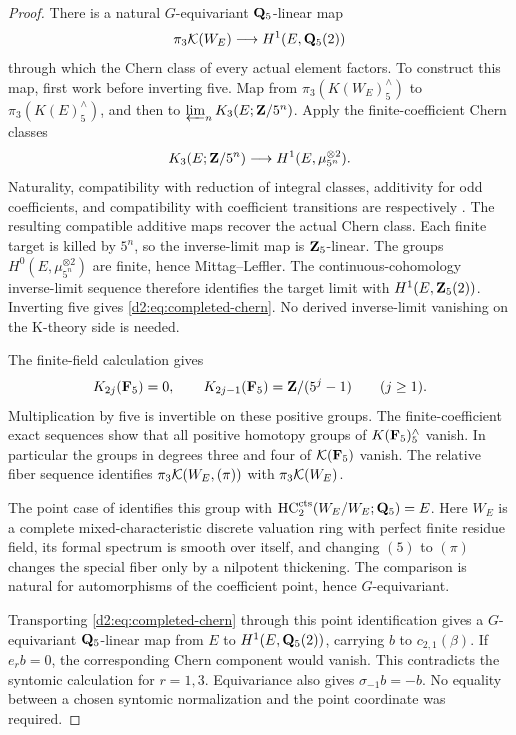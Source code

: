 \begin{proof}
There is a natural \(G\)-equivariant \(\mathbf{Q}_5\)-linear map
\begin{equation}\label{d2:eq:completed-chern}
 \pi_3\mathcal K(W_E)\longrightarrow H^1(E,\mathbf{Q}_5(2))
\end{equation}
through which the Chern class of every actual element factors.
To construct this map, first work before inverting five.
Map from \(\pi_3(K(W_E)^\wedge_5)\) to \(\pi_3(K(E)^\wedge_5)\), and then to
\(\varprojlim_nK_3(E;\mathbf{Z}/5^n)\).
Apply the finite-coefficient Chern classes
\[
 K_3(E;\mathbf{Z}/5^n)\longrightarrow
 H^1(E,\mu_{5^n}^{\otimes2}).
\]
Naturality, compatibility with reduction of integral classes,
additivity for odd coefficients, and compatibility with coefficient
transitions are respectively
\cite[Proposition~2.1.1, Lemma~2.3, Propositions~2.4 and~2.8]{WeibelChern}.
The resulting compatible additive maps recover the actual Chern
class. Each finite target is killed by \(5^n\), so the inverse-limit
map is \(\mathbf{Z}_5\)-linear.
The groups \(H^0(E,\mu_{5^n}^{\otimes2})\) are finite, hence
Mittag--Leffler. The continuous-cohomology inverse-limit sequence
therefore identifies the target limit with \(H^1(E,\mathbf{Z}_5(2))\).
Inverting five gives \eqref{d2:eq:completed-chern}.
No derived inverse-limit vanishing on the K-theory side is needed.

The finite-field calculation \cite{QuillenFinite}\cite[IV, Corollary~1.13]{Weibel} gives
\[
 K_{2j}(\mathbf{F}_5)=0,\qquad
 K_{2j-1}(\mathbf{F}_5)=\mathbf{Z}/(5^j-1)\qquad(j\ge1).
\]
Multiplication by five is invertible on these positive groups.
The finite-coefficient exact sequences show that all positive
homotopy groups of \(K(\mathbf{F}_5)^\wedge_5\) vanish.
In particular the groups in degrees three and four of
\(\mathcal K(\mathbf{F}_5)\) vanish.
The relative fiber sequence identifies
\(\pi_3\mathcal K(W_E,(\pi))\) with \(\pi_3\mathcal K(W_E)\).

The point case of
\cite[Theorem~A, Proposition~4.10, Corollary~3.8]{AMMN}
identifies this group with
\(\operatorname{HC}_2^{\mathrm{cts}}(W_E/W_E;\mathbf{Q}_5)=E\).
Here \(W_E\) is a complete mixed-characteristic discrete valuation
ring with perfect finite residue field, its formal spectrum is
smooth over itself, and changing \((5)\) to \((\pi)\) changes the
special fiber only by a nilpotent thickening.
The comparison is natural for automorphisms of the coefficient
point, hence \(G\)-equivariant.

Transporting \eqref{d2:eq:completed-chern} through this point
identification gives a \(G\)-equivariant \(\mathbf{Q}_5\)-linear map from
\(E\) to \(H^1(E,\mathbf{Q}_5(2))\), carrying \(b\) to
\(c_{2,1}(\beta)\).
If \(e_rb=0\), the corresponding Chern component would vanish.
This contradicts the syntomic calculation for \(r=1,3\).
Equivariance also gives \(\sigma_{-1}b=-b\).
No equality between a chosen syntomic normalization and the point
coordinate was required.
\end{proof}

